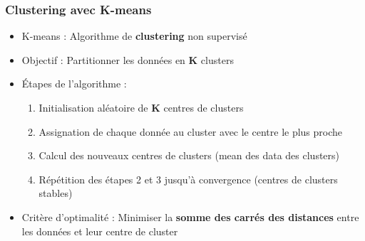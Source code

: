 \documentclass{beamer}
\begin{document}
\begin{frame}
	\frametitle{Clustering avec K-means}
\begin{itemize}
	\item K-means : Algorithme de \textbf{clustering} non supervisé
	\item Objectif : Partitionner les données en \textbf{K} clusters
	\item Étapes de l'algorithme :
	\begin{enumerate}
		\item Initialisation aléatoire de \textbf{K} centres de clusters
		\item Assignation de chaque donnée au cluster avec le centre le plus proche
		\item Calcul des nouveaux centres de clusters (mean des data des clusters)
		\item Répétition des étapes 2 et 3 jusqu'à convergence (centres de clusters stables)
	\end{enumerate}
	\item Critère d'optimalité : Minimiser la \textbf{somme des carrés des distances} entre les données et leur centre de cluster

\end{itemize}
\end{frame}
\end{document}
